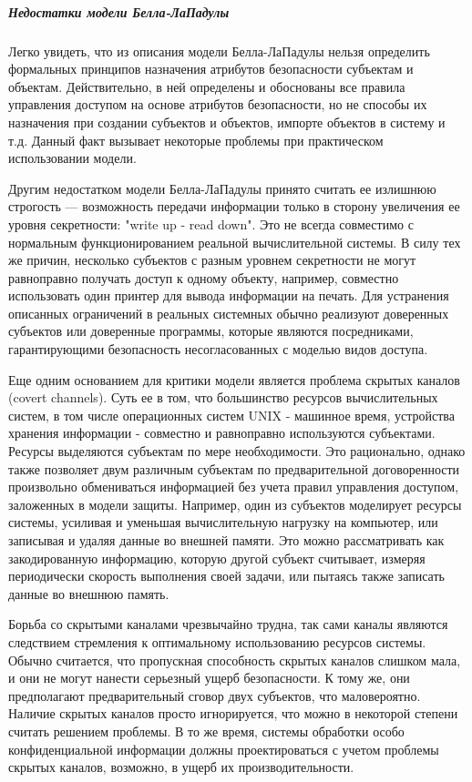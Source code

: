 \subparagraph{Недостатки модели Белла-ЛаПадулы}

Легко увидеть, что из описания модели Белла-ЛаПадулы нельзя определить формальных принципов назначения атрибутов безопасности субъектам и объектам. Действительно, в ней определены и обоснованы все правила управления доступом на основе атрибутов безопасности, но не способы их назначения при создании субъектов и объектов, импорте объектов в систему и т.д. Данный факт вызывает некоторые проблемы при практическом использовании модели.

Другим недостатком модели Белла-ЛаПадулы принято считать ее излишнюю строгость --- возможность передачи информации только в сторону увеличения ее уровня секретности: "write up - read down". Это не всегда совместимо с нормальным функционированием реальной вычислительной системы. В силу тех же причин, несколько субъектов с разным уровнем секретности не могут равноправно получать доступ к одному объекту, например, совместно использовать один принтер для вывода информации на печать. Для устранения описанных ограничений в реальных системных обычно реализуют доверенных субъектов или доверенные программы, которые являются посредниками, гарантирующими безопасность несогласованных с моделью видов доступа.

Еще одним основанием для критики модели является проблема скрытых каналов (covert channels). Суть ее в том, что большинство ресурсов вычислительных систем, в том числе операционных систем UNIX - машинное время, устройства хранения информации - совместно и равноправно используются субъектами. Ресурсы выделяются субъектам по мере необходимости. Это рационально, однако также позволяет двум различным субъектам по предварительной договоренности произвольно обмениваться информацией без учета правил управления доступом, заложенных в модели защиты. Например, один из субъектов моделирует ресурсы системы, усиливая и уменьшая вычислительную нагрузку на компьютер, или записывая и удаляя данные во внешней памяти. Это можно рассматривать как закодированную информацию, которую другой субъект считывает, измеряя периодически скорость выполнения своей задачи, или пытаясь также записать данные во внешнюю память.

Борьба со скрытыми каналами чрезвычайно трудна, так сами каналы являются следствием стремления к оптимальному использованию ресурсов системы. Обычно считается, что пропускная способность скрытых каналов слишком мала, и они не могут нанести серьезный ущерб безопасности. К тому же, они предполагают предварительный сговор двух субъектов, что маловероятно. Наличие скрытых каналов просто игнорируется, что можно в некоторой степени считать решением проблемы. В то же время, системы обработки особо конфиденциальной информации должны проектироваться с учетом проблемы скрытых каналов, возможно, в ущерб их производительности.

